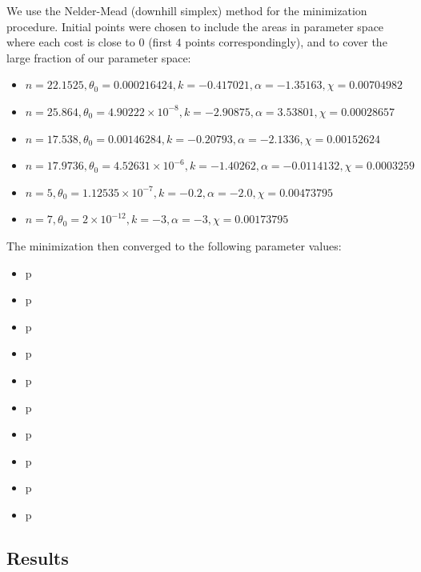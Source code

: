 \documentclass{article}
\begin{document}
We use the Nelder-Mead (downhill simplex) method for the minimization procedure. Initial points were chosen to include the areas in parameter space where each cost is close to $0$ (first $4$ points correspondingly), and to cover the large fraction of our parameter space:
\begin{itemize}
	\item{$n = 22.1525, \theta_0 = 0.000216424, k = -0.417021, \alpha = -1.35163, \chi = 0.00704982$}
	\item{$n = 25.864, \theta_0 = 4.90222 \times 10^{-8}, k = -2.90875, \alpha = 3.53801, \chi = 0.00028657$}
	\item{$n = 17.538, \theta_0 = 0.00146284, k = -0.20793, \alpha = -2.1336, \chi = 0.00152624$}
	\item{$n = 17.9736, \theta_0 = 4.52631 \times 10^{-6}, k = -1.40262, \alpha = -0.0114132, \chi = 0.0003259$}
	\item{$n = 5, \theta_0 = 1.12535 \times 10^{-7}, k = -0.2, \alpha = -2.0, \chi = 0.00473795$}
	\item{$n = 7, \theta_0 = 2 \times 10^{-12}, k = -3, \alpha = -3, \chi = 0.00173795$}
\end{itemize}

The minimization then converged to the following parameter values:
\begin{multicols}{2}
\begin{itemize}
		\item{p}
		\item{p}
		\item{p}
		\item{p}
		\item{p}
		\item{p}
		\item{p}
		\item{p}
		\item{p}
		\item{p}
\end{itemize}
\end{multicols}

\subsection{Results}
\end{document}
